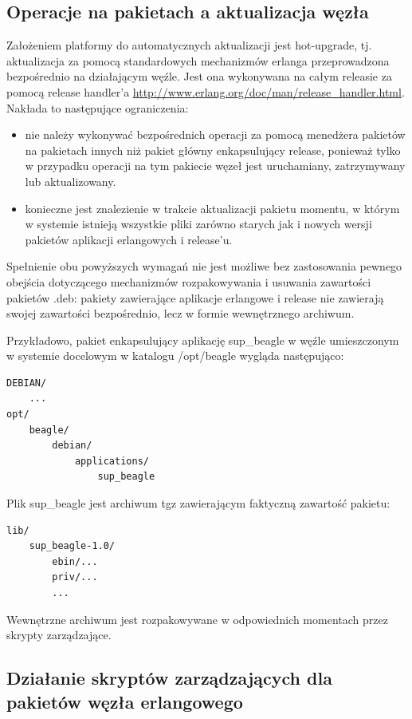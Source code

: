 \documentclass[polish,12pt]{aghthesis}
\begin{document}
\subsection{Operacje na pakietach a aktualizacja węzła}

Założeniem platformy do automatycznych aktualizacji jest hot-upgrade, tj. aktualizacja za pomocą standardowych mechanizmów erlanga przeprowadzona bezpośrednio na działającym węźle. Jest ona wykonywana na całym releasie za pomocą  release handler'a \url{http://www.erlang.org/doc/man/release_handler.html}. Nakłada to następujące ograniczenia:
\begin{itemize}
\item nie należy wykonywać bezpośrednich operacji za pomocą menedżera pakietów na pakietach innych niż pakiet główny enkapsulujący release, ponieważ tylko w przypadku operacji na tym pakiecie węzeł jest uruchamiany, zatrzymywany lub aktualizowany.
\item konieczne jest znalezienie w trakcie aktualizacji pakietu momentu, w którym w systemie istnieją wszystkie pliki zarówno starych jak i nowych wersji pakietów aplikacji erlangowych i release'u.
\end{itemize}

Spełnienie obu powyższych wymagań nie jest możliwe bez zastosowania pewnego obejścia dotyczącego mechanizmów rozpakowywania i usuwania zawartości pakietów .deb: pakiety zawierające aplikacje erlangowe i release nie zawierają swojej zawartości bezpośrednio, lecz w formie wewnętrznego archiwum.

Przykładowo, pakiet enkapsulujący aplikację sup\_beagle w węźle umieszczonym w systemie docelowym w katalogu /opt/beagle wygląda następująco:

\begin{verbatim}
DEBIAN/
    ...
opt/
    beagle/
        debian/
            applications/
                sup_beagle
\end{verbatim}

Plik sup\_beagle jest archiwum tgz zawierającym faktyczną zawartość pakietu:

\begin{verbatim}
lib/
    sup_beagle-1.0/
        ebin/...
        priv/...
        ...
\end{verbatim}

Wewnętrzne archiwum jest rozpakowywane w odpowiednich momentach przez skrypty zarządzające.

\subsection{Działanie skryptów zarządzających dla pakietów węzła erlangowego}
\end{document}
